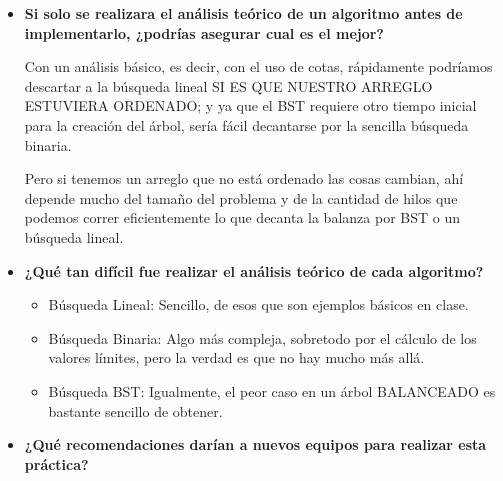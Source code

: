 \documentclass[12pt, fleqn]{article}                             %
\theoremstyle{break}                                            %
\begin{document}
\begin{itemize}
            \item
                \textbf{Si solo se realizara el análisis teórico de un algoritmo antes de
                implementarlo, ¿podrías asegurar cual es el mejor?}

                Con un análisis básico, es decir, con el uso de cotas, rápidamente podríamos descartar a
                la búsqueda lineal SI ES QUE NUESTRO ARREGLO ESTUVIERA ORDENADO; y ya que el BST
                requiere otro tiempo inicial para la creación del árbol, sería fácil decantarse por
                la sencilla búsqueda binaria.

                Pero si tenemos un arreglo que no está ordenado las cosas cambian, ahí depende mucho
                del tamaño del problema y de la cantidad de hilos que podemos correr eficientemente
                lo que decanta la balanza por BST o un búsqueda lineal.

            \item
                \textbf{¿Qué tan difícil fue realizar el análisis teórico de cada algoritmo?}

                \begin{itemize}
                    \item Búsqueda Lineal: Sencillo, de esos que son ejemplos básicos en clase.
                    \item Búsqueda Binaria: Algo más compleja, sobretodo por el cálculo de los
                    valores límites, pero la verdad es que no hay mucho más allá.
                    \item Búsqueda BST: Igualmente, el peor caso en un árbol BALANCEADO es bastante sencillo
                    de obtener.

                \end{itemize}

            \clearpage

            \item 
                \textbf{¿Qué recomendaciones darían a nuevos equipos para realizar esta práctica?}
                

\end{itemize}
\end{document}
